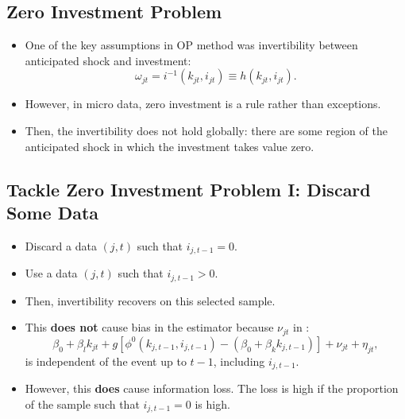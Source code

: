 \documentclass[
]{book}
\providecommand{\tightlist}{%
  \setlength{\itemsep}{0pt}\setlength{\parskip}{0pt}}
\begin{document}
\hypertarget{zero-investment-problem}{%
\subsection{Zero Investment Problem}\label{zero-investment-problem}}

\begin{itemize}
\tightlist
\item
  One of the key assumptions in OP method was invertibility between anticipated shock and investment:
  \begin{equation}
  \omega_{jt} = i^{-1}(k_{jt}, i_{jt}) \equiv h(k_{jt}, i_{jt}).
  \end{equation}
\item
  However, in micro data, zero investment is a rule rather than exceptions.
\item
  Then, the invertibility does not hold globally: there are some region of the anticipated shock in which the investment takes value zero.
\end{itemize}

\hypertarget{tackle-zero-investment-problem-i-discard-some-data}{%
\subsection{Tackle Zero Investment Problem I: Discard Some Data}\label{tackle-zero-investment-problem-i-discard-some-data}}

\begin{itemize}
\tightlist
\item
  Discard a data \((j, t)\) such that \(i_{j, t - 1} = 0\).
\item
  Use a data \((j, t)\) such that \(i_{j, t - 1} > 0\).
\item
  Then, invertibility recovers on this selected sample.
\item
  This \textbf{does not} cause bias in the estimator because \(\nu_{jt}\) in :
  \begin{equation}
  \beta_0 + \beta_l k_{jt} + g[\phi^0(k_{j, t - 1}, i_{j, t - 1}) - (\beta_0 + \beta_k k_{j, t - 1})] + \nu_{jt} + \eta_{jt},
  \end{equation}
  is independent of the event up to \(t - 1\), including \(i_{j, t - 1}\).
\item
  However, this \textbf{does} cause information loss. The loss is high if the proportion of the sample such that \(i_{j, t - 1} = 0\) is high.
\end{itemize}
\end{document}
